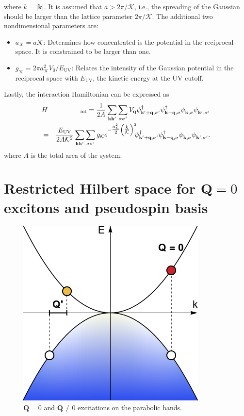 \documentclass[english,aps,prd,nofootinbib,twocolumn]{revtex4-1}
\begin{document}
where $k=|\mathbf{k}|$. It is assumed that $a>2\pi/\mathcal{K}$, i.e., the spreading of the Gaussian should be larger than the lattice parameter $2\pi/\mathcal{K}$. The additional two nondimensional parameters are:
\begin{itemize}
\item $a_{\mathcal{K}}=a\mathcal{K}$: Determines how concentrated is the potential in the reciprocal space. It is constrained to be larger than one.
\item $g_{\mathcal{K}}=2\pi a_{\mathcal{K}}^{2}V_{0}/E_{\mathrm{UV}}$: Relates the intensity of the Gaussian potential in the reciprocal space with $E_{\mathrm{UV}}$, the kinetic energy at the UV cutoff.
\end{itemize}
Lastly, the interaction Hamiltonian can be expressed as
\begin{eqnarray}
&H&\!_{\mathrm{int}} =
\frac{1}{2A}
\sum_{\mathbf{k }\mathbf{k'}}
\sum_{\sigma \sigma'} 
V_{\mathbf{q}}
\psi_{\mathbf{k'+q,\sigma'}}^{\textcolor{black}{\dagger}}
\psi_{\mathbf{k -q,\sigma }}^{\textcolor{black}{\dagger}}
\psi_{\mathbf{k   ,\sigma }}^{\textcolor{white}{\dagger}}
\psi_{\mathbf{k'  ,\sigma'}}^{\textcolor{white}{\dagger}} \\
 &=& \nonumber \frac{E_{\mathrm{UV}}}{2A\mathcal{K}^{2}}
\sum_{\mathbf{k }\mathbf{k'}}
\sum_{\sigma \sigma'} 
g_{\mathcal{K}}
e^{-\tfrac{a_{\mathcal{K}}^{2}}{2}\left( \tfrac{k}{\mathcal{K}} \right)^{2}}
\!\! 
\psi_{\mathbf{k'+q,\sigma'}}^{\textcolor{black}{\dagger}}
\psi_{\mathbf{k -q,\sigma }}^{\textcolor{black}{\dagger}}
\psi_{\mathbf{k   ,\sigma }}^{\textcolor{white}{\dagger}}
\psi_{\mathbf{k'  ,\sigma'}}^{\textcolor{white}{\dagger}}.
\end{eqnarray}
where $A$ is the total area of the system.

\section{Restricted Hilbert space for $\mathbf{Q}=0$ excitons and pseudospin basis}
\begin{figure}
\centering
\includegraphics[scale=0.45]{ParabolicVertical.png}
\caption{$\mathbf{Q}=0$ and $\mathbf{Q}\neq 0$ excitations on the parabolic bands.}
\label{fig:Q=0-excitons}
\end{figure}
\end{document}
